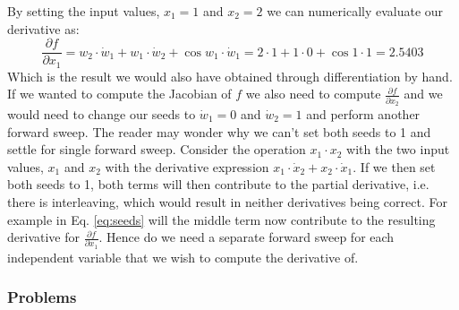 By setting the input values, $x_1 = 1$ and $x_2 = 2$ we can numerically evaluate our derivative as:
\begin{equation}
\frac{\partial f}{\partial x_1} = w_2 \cdot \dot{w}_1 + w_1 \cdot \dot{w}_2 + \cos w_1  \cdot  \dot{w}_1 =  2 \cdot 1 + 1 \cdot 0 + \cos 1 \cdot 1 = 2.5403
\label{eq:seeds}
\end{equation} 
Which is the result we would also have obtained through differentiation by hand. 
If we wanted to compute the Jacobian of $f$ we also need to compute $\frac{\partial f}{\partial x_2}$  
and we would need to change our seeds to $\dot{w}_1 = 0$ and $\dot{w}_2 = 1$ 
and perform another forward sweep. 
The reader may wonder why we can't set both seeds to 1 and settle for single forward sweep. 
Consider the operation $x_1 \cdot x_2$ with the two input values, $x_1$ and $x_2$ with the derivative expression
$x_1 \cdot \dot{x}_2 + x_2 \cdot \dot{x}_1$. If we then set both seeds to 1, both terms will then contribute to 
the partial derivative, i.e. there is interleaving, which would result in neither derivatives being correct. For example in Eq. \ref{eq:seeds}
will the middle term now contribute to the resulting derivative for $\frac{\partial f}{\partial x_1}$. Hence do we need a separate forward sweep for each
independent variable that we wish to compute the derivative of. 
\subsubsection{Problems}
